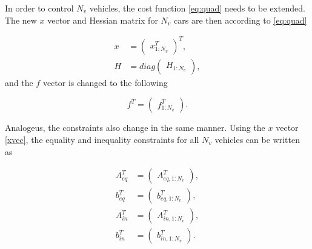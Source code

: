 \documentclass[letterpaper,10pt,conference]{ieeeconf}
\begin{document}
In order to control $N_v$ vehicles, the cost function \eqref{eq:quad} needs to be extended. The new $x$ vector and Hessian matrix for $N_v$ cars are then according to \eqref{eq:quad}

\begin{align}
x &=\begin{pmatrix}
x_{1:N_v}^T 
\end{pmatrix}^T,\label{xvec}\\
H &= diag\begin{pmatrix}H_{1:N_v}\end{pmatrix},
\end{align}
and the $f$ vector is changed to the following

\begin{equation}
f^T = 
\begin{pmatrix}
f^T_{1:N_v}
\end{pmatrix}.
\end{equation}

Analogeus, the constraints also change in the same manner. Using the $x$ vector \eqref{xvec}, the equality and inequality constraints for all $N_v$ vehicles can be written as

\begin{align}
A_{eq}^T&=
\begin{pmatrix}
    A_{eq,1:N_v}^T
    \end{pmatrix},\\
    b_{eq}^T&=\begin{pmatrix}
    b_{eq,1:N_v}^T
    \end{pmatrix}, \\
A_{in}^T&=
\begin{pmatrix}
    A_{in,1:N_v}^T
    \end{pmatrix},\\
    b_{in}^T&=\begin{pmatrix}
    b_{in,1:N_v}^T
    \end{pmatrix}.
\end{align}
\end{document}
